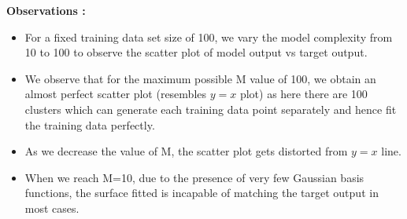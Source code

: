 \documentclass{article}
\begin{document}
\textbf{Observations : \newline}
\begin{itemize}
\item For a fixed training data set size of 100, we vary the model complexity from 10 to 100 to observe the scatter plot of model output vs target output.
\item We observe that for the maximum possible M value of 100, we obtain an almost perfect scatter plot (resembles $y=x$ plot) as here there are 100 clusters which can generate each training data point separately and hence fit the training data perfectly.
\item As we decrease the value of M, the scatter plot gets distorted from $y=x$ line.
\item When we reach M=10, due to the presence of very few Gaussian basis functions, the surface fitted is incapable of matching the target output in most cases.
\end{itemize}
\end{document}
